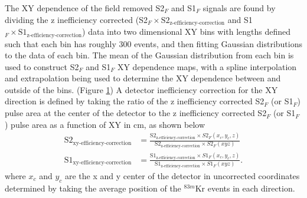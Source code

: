 The XY dependence of the field removed S2$_F$ and S1$_F$ signals are found by dividing the z inefficiency corrected (S2$_F \times \mbox{S}2_{\mbox{z-efficiency-correction}}$ and S1$_F \times \mbox{S}1_{\mbox{z-efficiency-correction}}$) data into two dimensional XY bins with lengths defined such that each bin has roughly 300 events, and then fitting Gaussian distributions to the data of each bin.  The mean of the Gaussian distribution from each bin is used to construct S2$_F$ and S1$_F$ XY dependence maps, with a spline interpolation and extrapolation being used to determine the XY dependence between and outside of the bins. (Figure \ref{fig:KrypCalXYDep}) A detector inefficiency correction for the XY direction is defined by taking the ratio of the z inefficiency corrected S2$_F$ (or S1$_F$) pulse area at the center of the detector to the z inefficiency corrected S2$_F$ (or S1$_F$) pulse area as a function of XY in cm, as shown below
\begin{align}
\mbox{S}2_{\mbox{xy-efficiency-correction}} &= \frac{\mbox{S}2_{\mbox{z-efficiency-correction}}\times S2_F(x_c,y_c,z)}{\mbox{S}2_{\mbox{z-efficiency-correction}}\times S2_F(xyz)} \\
\mbox{S}1_{\mbox{xy-efficiency-correction}} &= \frac{\mbox{S}1_{\mbox{z-efficiency-correction}}\times S1_F(x_c,y_c,z)}{\mbox{S}1_{\mbox{z-efficiency-correction}}\times S1_F(xyz)}.
\end{align} 
where $x_c$ and $y_c$ are the x and y center of the detector in uncorrected coordinates determined by taking the average position of the $^{83m}$Kr events in each direction.

\begin{figure}[!h]
\centering
{}
\qquad
{}
\label{fig:KrypCalXYDep}
\end{figure}

